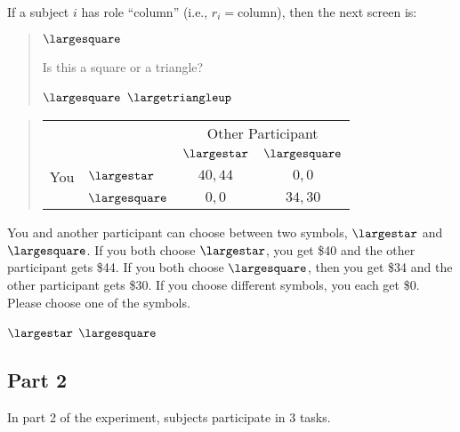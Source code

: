 \documentclass[11pt]{article}
\begin{document}
If a subject $i$ has role ``column'' (i.e., $r_i=\text{column}$), then the next screen is:
\begin{tcolorbox}
\begin{quote}
\begin{center}
{\Huge $\largesquare$}
\end{center}
 \centering Is this a square or a triangle?

 \begin{center}
$\largesquare$ \qquad $\largetriangleup$
\end{center}
\end{quote}

\begin{quote}
\begin{center}
\begin{tabular}{llcc}
    & & \multicolumn{2}{c}{Other Participant}  \\
& & $\largestar$ & $\largesquare$  \\ \cline{3-4}
You & $\largestar$ & \multicolumn{1}{|c|}{$40,44$} & \multicolumn{1}{c|}{$0,0$}  \\ \cline{3-4}
& $\largesquare$ & \multicolumn{1}{|c|}{$0,0$} & \multicolumn{1}{c|}{$34,30$}  \\ \cline{3-4}
\end{tabular}
\end{center}
\end{quote}

You and another participant can choose between two symbols, $\largestar$ and $\largesquare$. If you both choose $\largestar$, you get \$40 and the other participant gets \$44. If you both choose $\largesquare$, then you get \$34 and the other participant gets \$30. If you choose different symbols, you each get \$0.\\

Please choose one of the symbols.\\


\begin{center}
$\largestar$ \qquad $\largesquare$
\end{center}
\end{tcolorbox}





\subsection{Part 2}

In part 2 of the experiment, subjects participate in 3 tasks.
\end{document}
